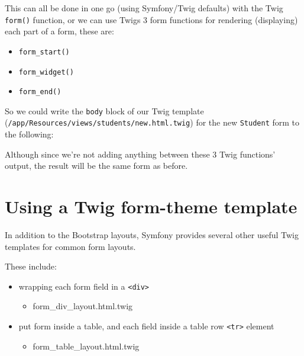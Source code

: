 \documentclass[a4paperpaper,openright]{book}
\newenvironment{Shaded}{}{}
\newcommand{\KeywordTok}[1]{\textcolor[rgb]{0.00,0.44,0.13}{\textbf{#1}}}
\newcommand{\NormalTok}[1]{#1}
\providecommand{\tightlist}{%
  \setlength{\itemsep}{0pt}\setlength{\parskip}{0pt}}
\begin{document}
This can all be done in one go (using Symfony/Twig defaults) with the
Twig \texttt{form()} function, or we can use Twigs 3 form functions for
rendering (displaying) each part of a form, these are:

\begin{itemize}
\tightlist
\item
  \texttt{form\_start()}
\item
  \texttt{form\_widget()}
\item
  \texttt{form\_end()}
\end{itemize}

So we could write the \texttt{body} block of our Twig template
(\texttt{/app/Resources/views/students/new.html.twig}) for the new
\texttt{Student} form to the following:

\begin{Shaded}
\end{Shaded}

Although since we're not adding anything between these 3 Twig functions'
output, the result will be the same form as before.

\hypertarget{using-a-twig-form-theme-template}{%
\section{Using a Twig form-theme
template}\label{using-a-twig-form-theme-template}}

In addition to the Bootstrap layouts, Symfony provides several other
useful Twig templates for common form layouts.

These include:

\begin{itemize}
\tightlist
\item
  wrapping each form field in a \texttt{\textless{}div\textgreater{}}

  \begin{itemize}
  \tightlist
  \item
    form\_div\_layout.html.twig
  \end{itemize}
\item
  put form inside a table, and each field inside a table row
  \texttt{\textless{}tr\textgreater{}} element

  \begin{itemize}
  \tightlist
  \item
    form\_table\_layout.html.twig
  \end{itemize}
\end{itemize}
\end{document}
